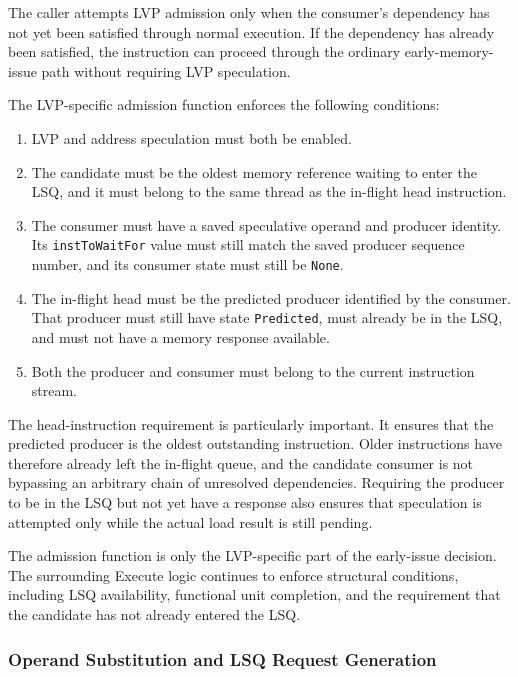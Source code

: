 The caller attempts LVP admission only when the consumer's
dependency has not yet been satisfied through normal execution.
If the dependency has already been satisfied, the instruction can
proceed through the ordinary early-memory-issue path without
requiring LVP speculation.

The LVP-specific admission function enforces the following
conditions:

\begin{enumerate}
    \item LVP and address speculation must both be enabled.

    \item The candidate must be the oldest memory reference waiting
    to enter the LSQ, and it must belong to the same thread as the
    in-flight head instruction.

    \item The consumer must have a saved speculative operand and
    producer identity. Its \texttt{inst\allowbreak ToWaitFor} value must still
    match the saved producer sequence number, and its consumer
    state must still be \texttt{None}.

    \item The in-flight head must be the predicted producer identified
    by the consumer. That producer must still have state
    \texttt{Predicted}, must already be in the LSQ, and must not
    have a memory response available.

    \item Both the producer and consumer must belong to the current
    instruction stream.
\end{enumerate}

The head-instruction requirement is particularly important. It
ensures that the predicted producer is the oldest outstanding
instruction. Older instructions have therefore already left the
in-flight queue, and the candidate consumer is not bypassing an
arbitrary chain of unresolved dependencies. Requiring the producer
to be in the LSQ but not yet have a response also ensures that
speculation is attempted only while the actual load result is still
pending.

The admission function is only the LVP-specific part of the
early-issue decision. The surrounding Execute logic continues to
enforce structural conditions, including LSQ availability, functional
unit completion, and the requirement that the candidate has not
already entered the LSQ.


\subsubsection{Operand Substitution and LSQ Request Generation}

